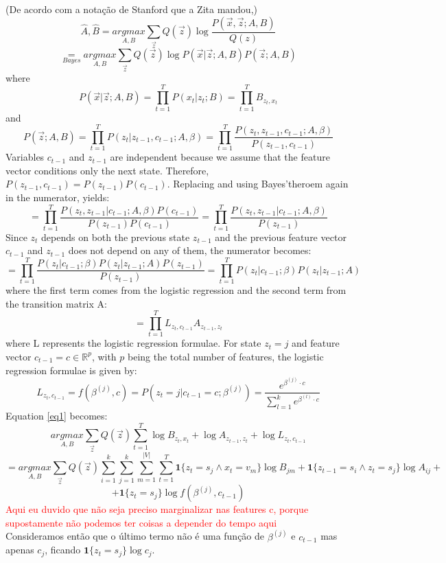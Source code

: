 \documentclass{article}
\begin{document}
\iffalse
(De acordo com a notação de Stanford que a Zita mandou,)
\[\hat{A},\hat{B} = \underset{A,B}{argmax} \sum_{\Vec{z}}Q(\Vec{z}) \log \dfrac{P(\Vec{x},\Vec{z};A,B)}{Q(z)}\]
\begin{equation}
    \underset{Bayes}{=}\underset{A,B}{argmax} \sum_{\Vec{z}}Q(\Vec{z}) \log P(\Vec{x}|\Vec{z};A,B)P(\Vec{z};A,B)
    \label{eq1}
\end{equation}
where
\[P(\Vec{x}|\Vec{z};A,B)=\prod_{t=1}^T P(x_t|z_t;B) = \prod_{t=1}^T B_{z_t,x_t}\]
and
\[P(\Vec{z};A,B)=\prod_{t=1}^T P(z_t|z_{t-1},c_{t-1};A, \beta) = \prod_{t=1}^T \dfrac{P(z_t,z_{t-1},c_{t-1};A, \beta)}{P(z_{t-1},c_{t-1})}\]
\noindent
Variables $c_{t-1}$ and $z_{t-1}$ are independent because we assume that the feature vector conditions only the next state. Therefore, $P(z_{t-1},c_{t-1}) = P(z_{t-1})P(c_{t-1})$. Replacing and using Bayes'theroem again in the numerator, yields:
\[= \prod_{t=1}^T \dfrac{P(z_t,z_{t-1}|c_{t-1};A, \beta)P(c_{t-1})}{P(z_{t-1})P(c_{t-1})} = \prod_{t=1}^T \dfrac{P(z_t,z_{t-1}|c_{t-1};A, \beta)}{P(z_{t-1})}\]
Since $z_t$ depends on both the previous state $z_{t-1}$ and the previous feature vector $c_{t-1}$ and $z_{t-1}$ does not depend on any of them, the numerator becomes:
\[= \prod_{t=1}^T \dfrac{P(z_t|c_{t-1};\beta)P(z_t|z_{t-1};A)P(z_{t-1})}{P(z_{t-1})} = \prod_{t=1}^T P(z_t|c_{t-1};\beta) P(z_t|z_{t-1};A)\]
where the first term comes from the logistic regression and the second term from the transition matrix A:
\[=\prod_{t=1}^T L_{z_t,c_{t-1}}A_{z_{t-1},z_t}\]
where L represents the logistic regression formulae. For state $z_t=j$ and feature vector $c_{t-1}=c\in \mathbb{R}^{p}$, with $p$ being the total number of features, the logistic regression formulae is given by:
\[L_{z_t,c_{t-1}}=f(\beta^{(j)},c)=P(z_t=j|c_{t-1}=c;\beta^{(j)})=\dfrac{e^{\beta^{(j)}\cdot c}}{\sum_{l=1}^k e^{\beta^{(l)}\cdot c}}\]
Equation \eqref{eq1} becomes:
\[\underset{A,B}{argmax} \sum_{\Vec{z}}Q(\Vec{z})\sum_{t=1}^T \log B_{z_t, x_t} + \log A_{z_{t-1}, z_t} + \log L_{z_t, c_{t-1}}\]
\[= \underset{A,B}{argmax} \sum_{\Vec{z}}Q(\Vec{z})\sum_{i=1}^k\sum_{j=1}^k \sum_{m=1}^{|V|}\sum_{t=1}^T \textbf{1}\{z_t=s_j \wedge x_t=v_m\}\log B_{jm} + \textbf{1}\{z_{t-1}=s_i \wedge z_t=s_j\}\log A_{ij} + \]
\[ + \textbf{1}\{z_t=s_j\}\log f(\beta^{(j)},c_{t-1})\]
\textcolor{red}{Aqui eu duvido que não seja preciso marginalizar nas features c, porque supostamente não podemos ter coisas a depender do tempo aqui}\\ \noindent
Consideramos então que o último termo não é uma função de $\beta^{(j)}$ e $c_{t-1}$ mas  apenas $c_j$, ficando $\textbf{1}\{z_t=s_j\}\log c_j$.
\end{document}
